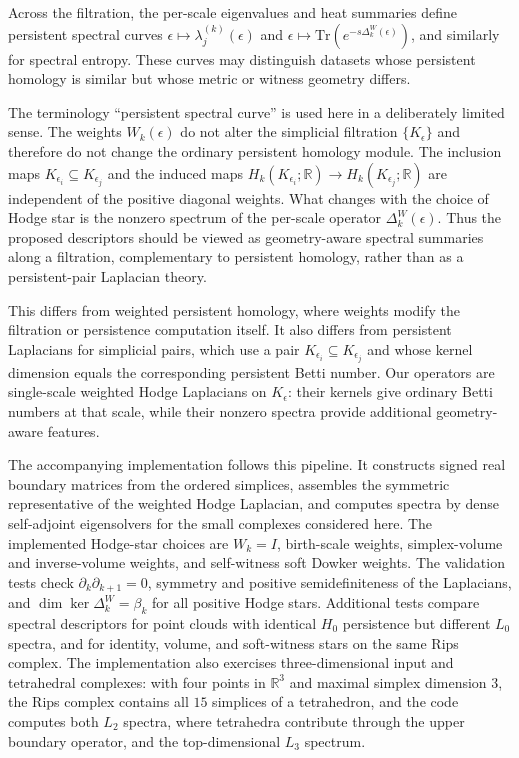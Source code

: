 \documentclass[11pt]{amsart}
\theoremstyle{plain}
\begin{document}
Across the filtration, the per-scale eigenvalues and heat summaries define persistent spectral
curves
$\epsilon\mapsto\lambda_j^{(k)}(\epsilon)$ and
$\epsilon\mapsto\mathrm{Tr}(e^{-s\Delta_k^W(\epsilon)})$, and similarly for spectral entropy.
These curves may distinguish datasets whose persistent homology is similar but whose metric or
witness geometry differs.

The terminology ``persistent spectral curve'' is used here in a deliberately limited sense. The
weights $W_k(\epsilon)$ do not alter the simplicial filtration $\{K_\epsilon\}$ and therefore do
not change the ordinary persistent homology module. The inclusion maps
$K_{\epsilon_i}\subseteq K_{\epsilon_j}$ and the induced maps
$H_k(K_{\epsilon_i};\mathbb R)\to H_k(K_{\epsilon_j};\mathbb R)$ are independent of the positive
diagonal weights. What changes with the choice of Hodge star is the nonzero spectrum of the
per-scale operator $\Delta_k^W(\epsilon)$. Thus the proposed descriptors should be viewed as
geometry-aware spectral summaries along a filtration, complementary to persistent homology, rather
than as a persistent-pair Laplacian theory.

This differs from weighted persistent homology, where weights modify the filtration or persistence
computation itself. It also differs from persistent Laplacians for simplicial pairs, which use a
pair $K_{\epsilon_i}\subseteq K_{\epsilon_j}$ and whose kernel dimension equals the corresponding
persistent Betti number. Our operators are single-scale weighted Hodge Laplacians on $K_\epsilon$:
their kernels give ordinary Betti numbers at that scale, while their nonzero spectra provide
additional geometry-aware features.

The accompanying implementation follows this pipeline. It constructs signed real boundary matrices
from the ordered simplices, assembles the symmetric representative of the weighted Hodge Laplacian,
and computes spectra by dense self-adjoint eigensolvers for the small complexes considered here.
The implemented Hodge-star choices are $W_k=I$, birth-scale weights, simplex-volume and
inverse-volume weights, and self-witness soft Dowker weights. The validation tests check
$\partial_k\partial_{k+1}=0$, symmetry and positive semidefiniteness of the Laplacians, and
$\dim\ker\Delta_k^W=\beta_k$ for all positive Hodge stars. Additional tests compare spectral
descriptors for point clouds with identical $H_0$ persistence but different $L_0$ spectra, and for
identity, volume, and soft-witness stars on the same Rips complex. The implementation also exercises
three-dimensional input and tetrahedral complexes: with four points in $\mathbb{R}^3$ and
maximal simplex dimension $3$, the Rips complex contains all $15$ simplices of a tetrahedron, and
the code computes both $L_2$ spectra, where tetrahedra contribute through the upper boundary
operator, and the top-dimensional $L_3$ spectrum.
\end{document}

